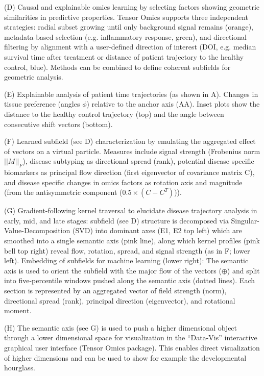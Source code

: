     \vspace{0.5cm}
    (D) Causal and explainable omics learning by selecting factors showing geometric similarities in predictive properties. Tensor Omics supports three independent strategies: radial subset growing until only background signal remains (orange), metadata-based selection (e.g. inflammatory response, green), and directional filtering by alignment with a user-defined direction of interest (DOI, e.g. median survival time after treatment or distance of patient trajectory to the healthy control, blue). Methods can be combined to define coherent subfields for geometric analysis.

    \vspace{0.5cm}
    (E) Explainable analysis of patient time trajectories (as shown in A). Changes in tissue preference (angles $\phi$) relative to the anchor axis (AA). Inset plots show the distance to the healthy control trajectory (top) and the angle between consecutive shift vectors (bottom).

    \vspace{0.5cm}
    (F) Learned subfield (see D) characterization by emulating the aggregated effect of vectors on a virtual particle. Measures include signal strength (Frobenius norm $||M||_F$), disease subtyping as directional spread (rank), potential disease specific biomarkers as principal flow direction (first eigenvector of covariance matrix C), and disease specific changes in omics factors as rotation axis and magnitude (from the antisymmetric component ($0.5 \times (C - C^T)$)).

    \vspace{0.5cm}
    (G) Gradient-following kernel traversal to elucidate disease trajectory analysis in early, mid, and late stages: subfield (see D) structure is decomposed via Singular-Value-Decomposition (SVD) into dominant axes (E1, E2 top left) which are smoothed into a single semantic axis (pink line), along which kernel profiles (pink bell top right) reveal flow, rotation, spread, and signal strength (as in F; lower left). Embedding of subfields for machine learning (lower right): The semantic axis is used to orient the subfield with the major flow of the vectors ($\oplus$) and split into five-percentile windows pushed along the semantic axis (dotted lines). Each section is represented by an aggregated vector of field strength (norm), directional spread (rank), principal direction (eigenvector), and rotational moment.

    \vspace{0.5cm}
    (H) The semantic axis (see G) is used to push a higher dimensional object through a lower dimensional space for visualization in the ``Data-Vis'' interactive graphical user interface (Tensor Omics package). This enables direct visualization of higher dimensions and can be used to show for example the developmental hourglass.

